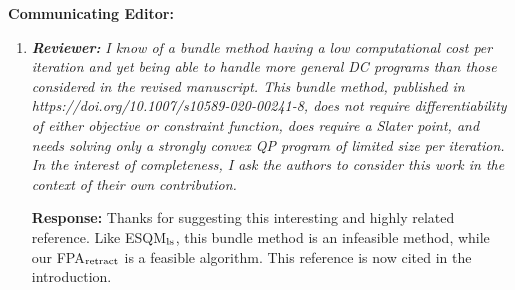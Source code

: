 \documentclass{article}
\begin{document}
\textbf{Communicating Editor:}
\begin{enumerate}
	\item  \textit{\textbf{Reviewer:}} \textit{ I know of a bundle method having a low computational cost per iteration and yet being able to handle more general DC programs than those considered in the revised manuscript. This bundle method, published in https://doi.org/10.1007/s10589-020-00241-8, does not require differentiability of either objective or constraint function, does require a Slater point, and needs solving only a strongly convex QP program of limited size per iteration.  In the interest of completeness, I ask the authors to consider this work in the context of their own contribution.}
	
	\textbf{Response:} Thanks for suggesting this interesting and highly related reference. Like ESQM$_{\rm ls}$, this bundle method is an infeasible method, while our FPA$_{\rm retract}$ is a feasible algorithm. This reference is now cited in the introduction.
	
\end{enumerate}
\end{document}
